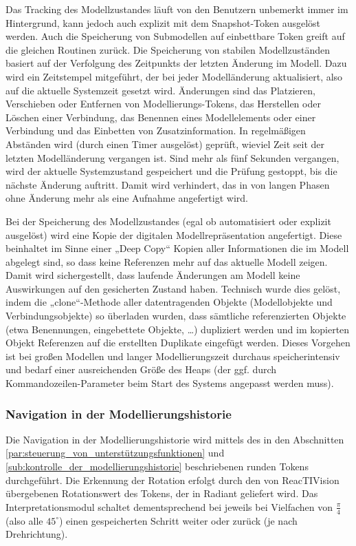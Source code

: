 Das Tracking des Modellzustandes läuft von den Benutzern unbemerkt immer im Hintergrund, kann jedoch auch explizit mit dem Snapshot-Token ausgelöst werden. Auch die Speicherung von Submodellen auf einbettbare Token greift auf die gleichen Routinen zurück. Die Speicherung von stabilen Modellzuständen basiert auf der Verfolgung des Zeitpunkts der letzten Änderung im Modell. Dazu wird ein Zeitstempel mitgeführt, der bei jeder Modelländerung aktualisiert, also auf die aktuelle Systemzeit gesetzt wird. Änderungen sind das Platzieren, Verschieben oder Entfernen von Modellierungs-Tokens, das Herstellen oder Löschen einer Verbindung, das Benennen eines Modellelements oder einer Verbindung und das Einbetten von Zusatzinformation. In regelmäßigen Abständen wird (durch einen Timer ausgelöst) geprüft, wieviel Zeit seit der letzten Modelländerung vergangen ist. Sind mehr als fünf Sekunden vergangen, wird der aktuelle Systemzustand gespeichert und die Prüfung gestoppt, bis die nächste Änderung auftritt. Damit wird verhindert, das in von langen Phasen ohne Änderung mehr als eine Aufnahme angefertigt wird.

Bei der Speicherung des Modellzustandes (egal ob automatisiert oder explizit ausgelöst) wird eine Kopie der digitalen Modellrepräsentation angefertigt. Diese beinhaltet im Sinne einer „Deep Copy“ Kopien aller Informationen die im Modell abgelegt sind, so dass keine Referenzen mehr auf das aktuelle Modell zeigen. Damit wird sichergestellt, dass laufende Änderungen am Modell keine Auswirkungen auf den gesicherten Zustand haben. Technisch wurde dies gelöst, indem die „clone“-Methode aller datentragenden Objekte (Modellobjekte und Verbindungsobjekte) so überladen wurden, dass sämtliche referenzierten Objekte (etwa Benennungen, eingebettete Objekte, \ldots) dupliziert werden und im kopierten Objekt Referenzen auf die erstellten Duplikate eingefügt werden. Dieses Vorgehen ist bei großen Modellen und langer Modellierungszeit durchaus speicherintensiv und bedarf einer ausreichenden Größe des Heaps (der ggf. durch Kommandozeilen-Parameter beim Start des Systems angepasst werden muss).

\subsubsection{Navigation in der Modellierungshistorie} %
\label{ssub:navigation_durch_die_modellierungshistorie}

Die Navigation in der Modellierungshistorie wird mittels des in den Abschnitten \ref{par:steuerung_von_unterstützungsfunktionen} und \ref{sub:kontrolle_der_modellierungshistorie} beschriebenen runden Tokens durchgeführt. Die Erkennung der Rotation erfolgt durch den von ReacTIVision übergebenen Rotationswert des Tokens, der in Radiant geliefert wird. Das Interpretationsmodul schaltet dementsprechend bei jeweils bei Vielfachen von $\frac{\pi}{4}$ (also alle $45^\circ$) einen gespeicherten Schritt weiter oder zurück (je nach Drehrichtung).

